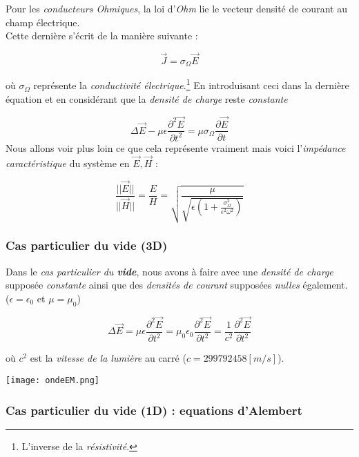 \documentclass[a4paper,12pt]{article}
\begin{document}
Pour les \textit{conducteurs Ohmiques}, la loi d'\textit{Ohm} lie le vecteur densité de courant au champ électrique. \\
Cette dernière s'écrit de la manière suivante : 

\[\vec{J} = \sigma_{\Omega} \vec{E} \]

où $\sigma_{\Omega}$ représente la \textit{conductivité électrique}.\footnote{L'inverse de la \textit{résistivité}.} En introduisant ceci dans la dernière équation et en considérant que la
\textit{densité de charge} reste \textit{constante} 

\[ \Delta \vec{E} - \mu \epsilon  \frac{\partial^{2} \vec{E}}{\partial t^{2}} = \mu \sigma_{\Omega} \frac{\partial \vec{E}}{\partial t} \]
Nous allons voir plus loin ce que cela représente vraiment mais voici l'\textit{impédance caractéristique} du système en $\vec{E},\vec{H}$ : 

\[ \frac{|| \vec{E} ||}{|| \vec{H} ||} =  \frac{E}{H} =\sqrt{\frac{\mu}{\sqrt{\epsilon(1+\frac{\sigma_{\Omega}^{2}}{\epsilon^{2} \omega^{2}})}}}\]

\subsubsection{Cas particulier du vide (3D)} 

Dans le \textit{cas particulier du \textbf{vide}}, nous avons à faire avec une \textit{densité de charge} supposée \textit{constante} ainsi que des \textit{densités de courant} supposées \textit{nulles} également.
($\epsilon = \epsilon_{0}$ et $\mu = \mu_{0}$)

\[ \Delta \vec{E} = \mu \epsilon  \frac{\partial^{2} \vec{E}}{\partial t^{2}} = \mu_{0} \epsilon_{0}  \frac{\partial^{2} \vec{E}}{\partial t^{2}} =\frac{1}{c^{2}} \frac{\partial^{2} \vec{E}}{\partial t^{2}} \]

où $c^{2}$ est la \textit{vitesse de la lumière} au carré ($c = 299 792 458 [m/s]$).

\begin{center}
\texttt{[image: ondeEM.png]}
\end{center}

\newpage

\subsubsection{Cas particulier du vide (1D) : equations d'Alembert}
\end{document}
